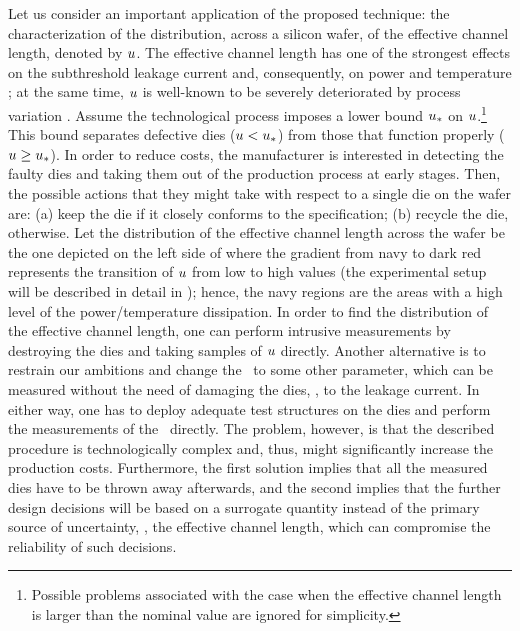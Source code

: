 
Let us consider an important application of the proposed technique: the characterization of the distribution, across a silicon wafer, of the effective channel length, denoted by $u$. The effective channel length has one of the strongest effects on the subthreshold leakage current and, consequently, on power and temperature \cite{juan2011, juan2012}; at the same time, $u$ is well-known to be severely deteriorated by process variation \cite{chandrakasan2001, srivastava2010}.
Assume the technological process imposes a lower bound $u_*$ on $u$.\footnote{Possible problems associated with the case when the effective channel length is larger than the nominal value are ignored for simplicity.} This bound separates defective dies ($u < u_*$) from those that function properly ($u \geq u_*$).
In order to reduce costs, the manufacturer is interested in detecting the faulty dies and taking them out of the production process at early stages. Then, the possible actions that they might take with respect to a single die on the wafer are: (a) keep the die if it closely conforms to the specification; (b) recycle the die, otherwise.
Let the distribution of the effective channel length across the wafer be the one depicted on the left side of  where the gradient from navy to dark red represents the transition of $u$ from low to high values (the experimental setup will be described in detail in ); hence, the navy regions are the areas with a high level of the power/temperature dissipation.
In order to find the distribution of the effective channel length, one can perform intrusive measurements by destroying the dies and taking samples of $u$ directly.
Another alternative is to restrain our ambitions and change the \qoi\ to some other parameter, which can be measured without the need of damaging the dies, \eg, to the leakage current. In either way, one has to deploy adequate test structures on the dies and perform the measurements of the \qoi\ directly. The problem, however, is that the described procedure is technologically complex and, thus, might significantly increase the production costs.
Furthermore, the first solution implies that all the measured dies have to be thrown away afterwards, and the second implies that the further design decisions will be based on a surrogate quantity instead of the primary source of uncertainty, \ie, the effective channel length, which can compromise the reliability of such decisions.


